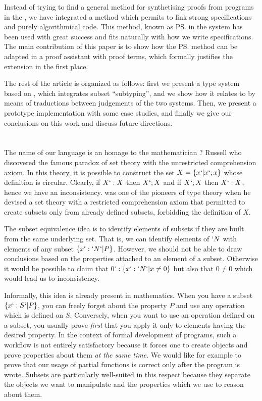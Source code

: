 \documentclass[twocolumn]{article}
\begin{document}
Instead of trying to find a general method for synthetising proofs from
programs in the \CICfull, we have integrated a method which permits to
link strong specifications and purely algorithmical code. This method,
known as \ps{} in the \PVS{} system has been used with great success and
fits naturally with how we write specifications. The main contribution
of this paper is to show how the \ps{} method can be adapted in a proof
assistant with proof terms, which formally justifies the extension in
the first place.

The rest of the article is organized as follows: first we present a
type system based on \ECC{}, which integrates subset ``subtyping'', and
we show how it relates to \CIC{} by means of traductions between
judgements of the two systems. Then, we present a prototype
implementation with some case studies, and finally we give our
conclusions on this work and discuss future directions.

\section{\Russell{}}
The name of our language is an homage to the mathematician ? Russell who
discovered the famous paradox of set theory with the unrestricted
comprehension axiom. In this theory, it is possible to construct the set
$X = \{x `| x `; x\}$ whose definition is circular. Clearly, if $X `: X$
then $X `; X$ and if $X `; X$ then $X `: X$, hence we have an
inconsistency. \Russell{} was one of the pioneers of type theory when he
devised a set theory with a restricted comprehension axiom that
permitted to create subsets only from already defined subsets,
forbidding the definition of $X$. 

The subset equivalence idea is to identify elements of subsets if
they are built from the same underlying set. That is, we can identify
elements of $`N$ with elements of any subset $\{ x `: `N `| P \}$.
However, we should not be able to draw conclusions based on the
properties attached to an element of a subset. Otherwise it would be
possible to claim that $0 `: \{ x `: `N `| x \neq 0 \}$ but also that $0
\neq 0$ which would lead us to inconsistency. 

Informally, this idea is already present in mathematics. When you have a
subset $\{ x `: S `| P \}$, you can freely forget about the property $P$
and use any operation which is defined on $S$. Conversely, when you
want to use an operation defined on a subset, you usually prove \emph{first}
that you apply it only to elements having the desired property. 
In the context of formal development of programs, such a workflow is not
entirely satisfactory because it forces one to create objects and prove
properties about them \emph{at the same time}. We would like for example
to prove that our usage of partial functions is correct only after the
program is wrote. Subsets are particularly well-suited in this respect
because they separate the objects we want to manipulate and the
properties which we use to reason about them.
\end{document}

